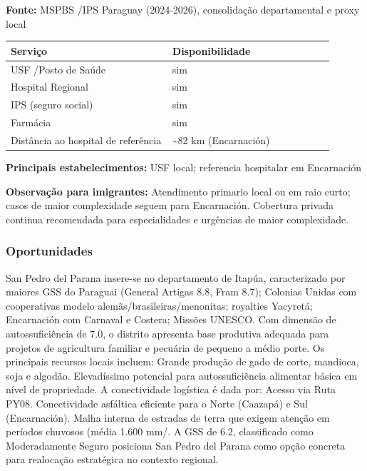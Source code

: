 \textbf{Fonte:} MSPBS /\allowbreak  IPS Paraguay (2024-2026), consolidação
departamental e proxy local

{\def\LTcaptype{none} %
\begin{longtable}{@{}>{\raggedright\arraybackslash}p{0.45\linewidth} >{\raggedright\arraybackslash}p{0.45\linewidth}@{}}
\toprule\noalign{}
Serviço & Disponibilidade \\
\midrule\noalign{}
\endhead
\bottomrule\noalign{}
\endlastfoot
USF /\allowbreak  Posto de Saúde & sim \\
Hospital Regional & sim \\
IPS (seguro social) & sim \\
Farmácia & sim \\
Distância ao hospital de referência & \textasciitilde82 km
(Encarnación) \\
\end{longtable}
}

\textbf{Principais estabelecimentos:} USF local; referencia hospitalar
em Encarnación

\textbf{Observação para imigrantes:} Atendimento primario local ou em
raio curto; casos de maior complexidade seguem para Encarnación.
Cobertura privada continua recomendada para especialidades e urgências
de maior complexidade.
\newpage

\subsubsection*{Oportunidades}\label{oport-san-pedro-del-parana-0720}
San Pedro del Parana insere-se no departamento de Itapúa, caracterizado por maiores GSS do Paraguai (General Artigas 8.8, Fram 8.7); Colonias Unidas com cooperativas modelo alemãs/brasileiras/menonitas; royalties Yacyretá; Encarnación com Carnaval e Costera; Missões UNESCO. Com dimensão de autossuficiência de 7.0, o distrito apresenta base produtiva adequada para projetos de agricultura familiar e pecuária de pequeno a médio porte. Os principais recursos locais incluem: Grande produção de gado de corte, mandioca, soja e algodão. Elevadíssimo potencial para autossuficiência alimentar básica em nível de propriedade. A conectividade logística é dada por: Acesso via Ruta PY08. Conectividade asfáltica eficiente para o Norte (Caazapá) e Sul (Encarnación). Malha interna de estradas de terra que exigem atenção em períodos chuvosos (média 1.600 mm/. A GSS de 6.2, classificado como Moderadamente Seguro posiciona San Pedro del Parana como opção concreta para realocação estratégica no contexto regional.

